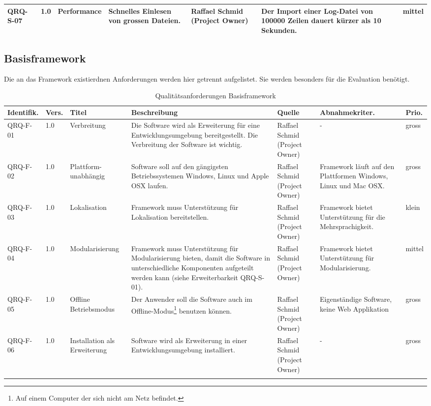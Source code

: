 \begin{landscape}
\begin{longtable}{|p{1.6cm}|p{0.7cm}|p{2.5cm}|p{4.5cm}|p{2.6cm}|p{4cm}|p{0.9cm}|}
   QRQ-S-07 & 1.0 & Performance & Schnelles Einlesen von grossen Dateien. & Raffael Schmid (Project Owner) & Der Import einer Log-Datei von 100000 Zeilen dauert kürzer als 10 Sekunden.&mittel \\\hline

\end{longtable}
\subsection{Basisframework}\label{anforderungen_framework}
Die an das Framework existierdnen Anforderungen werden hier getrennt aufgelistet. Sie werden besonders für die Evaluation benötigt.

\begin{longtable}{|p{1.6cm}|p{0.7cm}|p{2.5cm}|p{4.5cm}|p{2.6cm}|p{4cm}|p{0.9cm}|}
    \hline\textbf{Identifik.} & \textbf{Vers.}& \textbf{Titel} & \textbf{Beschreibung} & \textbf{Quelle} & \textbf{Abnahmekriter.} & \textbf{Prio.}\\\hline
   QRQ-F-01 & 1.0 & Verbreitung & Die Software wird als Erweiterung für eine Entwicklungsumgebung bereitgestellt. Die Verbreitung der Software ist wichtig. & Raffael Schmid (Project Owner) & - & gross \\\hline

   QRQ-F-02 & 1.0 & Plattform-unabhängig & Software soll auf den gängigsten Betriebssystemen Windows, Linux und Apple OSX laufen. & Raffael Schmid (Project Owner) &  Framework läuft auf den Plattformen Windows, Linux und Mac OSX. & gross \\\hline

   QRQ-F-03 & 1.0 & Lokalisation & Framework muss Unterstützung für Lokalisation bereitstellen.& Raffael Schmid (Project Owner) & Framework bietet Unterstützung für die Mehrsprachigkeit. &klein \\\hline

   QRQ-F-04 & 1.0 & Modularisierung & Framework muss Unterstützung für Modularisierung bieten, damit die Software in unterschiedliche Komponenten aufgeteilt werden kann (siehe Erweiterbarkeit QRQ-S-01). & Raffael Schmid (Project Owner) & Framework bietet Unterstützung für Modularisierung.&mittel \\\hline

   QRQ-F-05 & 1.0 & Offline Betriebsmodus & Der Anwender soll die Software auch im Offline-Modus\footnote{Auf einem Computer der sich nicht am Netz befindet.} benutzen können. & Raffael Schmid (Project Owner) & Eigenständige Software, keine Web Applikation & gross  \\\hline

   QRQ-F-06 & 1.0 & Installation als Erweiterung& Software wird als Erweiterung in einer Entwicklungsumgebung installiert. & Raffael Schmid (Project Owner) & - & gross  \\\hline
    \caption{Qualitätsanforderungen Basisframework}
\end{longtable}
\end{landscape}
